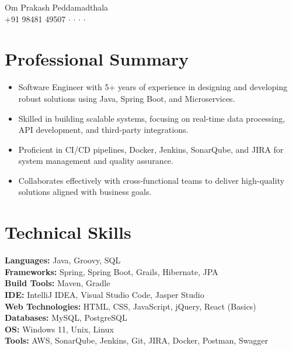 \documentclass[letterpaper,10pt]{article}
\newcommand{\resumeItem}[1]{
  \item\small{
    {#1 \vspace{-1pt}}
  }
}
\newcommand{\resumeItemListStart}{\begin{itemize}[leftmargin=0.1in, itemsep=1pt]}
\newcommand{\resumeItemListEnd}{\end{itemize}\vspace{-3pt}}
\begin{document}
\begin{center}
    {\LARGE Om Prakash Peddamadthala} \\
    \vspace{2pt}
    \small
    {+91 98481 49507} $\cdot$
    \href{[url to portfolio]}{\color{blue}{Portfolio}} $\cdot$
    \href{mailto:omprakashornold@gmail.com}{\color{blue}{omprakashornold@gmail.com}} $\cdot$
    \href{https://www.linkedin.com/in/omprakash-peddamadthala/}{\color{blue}{linkedin.com/in/omprakash-peddamadthala}} $\cdot$
    \href{https://github.com/omprakashpeddamadthala}{\color{blue}{github.com/omprakashpeddamadthala}} \\
    \vspace{-5pt}
\end{center}

\section{\color{airforceblue}Professional Summary}
\resumeItemListStart
\resumeItem{Software Engineer with 5+ years of experience in designing and developing robust solutions using Java, Spring Boot, and Microservices.}
\resumeItem{Skilled in building scalable systems, focusing on real-time data processing, API development, and third-party integrations.}
\resumeItem{Proficient in CI/CD pipelines, Docker, Jenkins, SonarQube, and JIRA for system management and quality assurance.}
\resumeItem{Collaborates effectively with cross-functional teams to deliver high-quality solutions aligned with business goals.}
\resumeItemListEnd

\section{\color{airforceblue}Technical Skills}
\begin{itemize}[leftmargin=0in, label={}]
    \small{\item{
      \textbf{Languages:} Java, Groovy, SQL \\
      \textbf{Frameworks:} Spring, Spring Boot, Grails, Hibernate, JPA \\
      \textbf{Build Tools:} Maven, Gradle \\
      \textbf{IDE:} IntelliJ IDEA, Visual Studio Code, Jasper Studio \\
      \textbf{Web Technologies:} HTML, CSS, JavaScript, jQuery, React (Basics) \\
      \textbf{Databases:} MySQL, PostgreSQL \\
      \textbf{OS:} Windows 11, Unix, Linux \\
      \textbf{Tools:} AWS, SonarQube, Jenkins, Git, JIRA, Docker, Postman, Swagger \\
    }}
\end{itemize}
\end{document}

